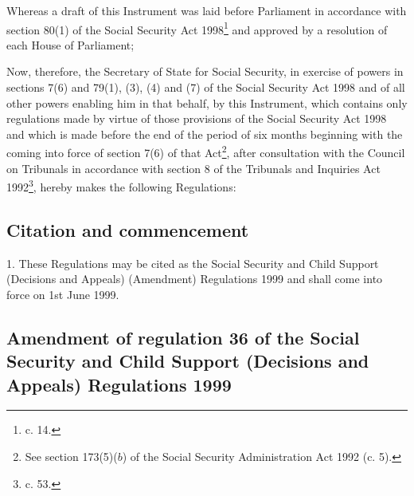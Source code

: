 \documentclass[12pt,a4paper]{article}
\title{\regstitle}
\author{S.I. 1999 No. 1466}
\date{Made 24th May 1999\\Coming into force 1st June 1999}
\begin{document}
\maketitle

\noindent
Whereas a draft of this Instrument was laid before Parliament in accordance with section 80(1) of the Social Security Act 1998\footnote{ c. 14.} and approved by a resolution of each House of Parliament;

Now, therefore, the Secretary of State for Social Security, in exercise of powers in sections 7(6) and 79(1), (3), (4) and (7) of the Social Security Act 1998 and of all other powers enabling him in that behalf, by this Instrument, which contains only regulations made by virtue of those provisions of the Social Security Act 1998 and which is made before the end of the period of six months beginning with the coming into force of section 7(6) of that Act\footnote{\frenchspacing See section 173(5)($b$) of the Social Security Administration Act 1992 (c. 5).}, after consultation with the Council on Tribunals in accordance with section 8 of the Tribunals and Inquiries Act 1992\footnote{ c. 53.}, hereby makes the following Regulations: 

{\sloppy

\tableofcontents

}

\bigskip

\setcounter{secnumdepth}{-2}

\subsection[1. Citation and commencement]{Citation and commencement}

1.  These Regulations may be cited as the Social Security and Child Support (Decisions and Appeals) (Amendment) Regulations 1999 and shall come into force on 1st June 1999.

\subsection[2. Amendment of regulation 36 of the Social Security and Child Support (Decisions and Appeals) Regulations 1999]{Amendment of regulation 36 of the Social Security and Child Support (Decisions and Appeals) Regulations 1999}
\end{document}
